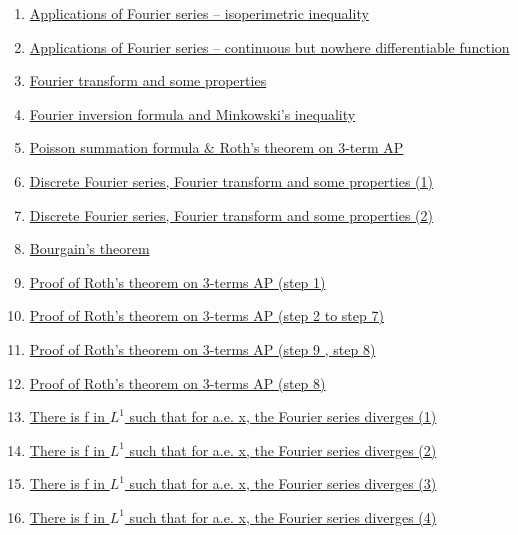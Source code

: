 \documentclass[11pt]{article}
\begin{document}
\begin{enumerate}
	\item	\href{https://mp.weixin.qq.com/s/iIWy0J2VjjtLPdH1Xtpw2A}{Applications of Fourier series – isoperimetric inequality} 	%
	\item 	\href{https://mp.weixin.qq.com/s/zFWDaC4RMTNcZMaEoUb7Iw}{Applications of Fourier series – continuous but nowhere differentiable function}	%
	\item 	\href{https://mp.weixin.qq.com/s/vafsXLbIouwEudCbt6gzhA}{Fourier transform and some properties}	%
	\item 	\href{https://mp.weixin.qq.com/s/hBs4ElZa2V95lLbnyi3qNg}{Fourier inversion formula and Minkowski's inequality}	%
	\item 	\href{https://mp.weixin.qq.com/s/JZXYVWcqn5tfjxecIPsyEA}{Poisson summation formula \& Roth's theorem on 3-term AP}	%
	\item 	\href{https://mp.weixin.qq.com/s/HKBxFlChuJpQPru7-EUPMA}{Discrete Fourier series, Fourier transform and some properties (1)}	%
	\item 	\href{https://mp.weixin.qq.com/s/dbqjLczJmPPk2UCY1gu5uA}{Discrete Fourier series, Fourier transform and some properties (2)}	%
	\item 	\href{https://mp.weixin.qq.com/s/-CJqt4TfShm67tdGhtJIQA}{Bourgain's theorem}	%
	\item	\href{https://mp.weixin.qq.com/s/m7KBS-pxKYPkdu2C5qcaYA}{Proof of Roth's theorem on 3-terms AP (step 1)}	%
	\item	\href{https://mp.weixin.qq.com/s/YQKnyXQFBdJaGGZW8PIYyA}{Proof of Roth's theorem on 3-terms AP (step 2 to step 7)}	%
	\item	\href{https://mp.weixin.qq.com/s/uNtqocYMHuEJGnJACyzCCA}{Proof of Roth's theorem on 3-terms AP (step 9 , step 8)} 	%
	\item 	\href{https://mp.weixin.qq.com/s/F09dwuDWQZo2icfUVU5n8g}{Proof of Roth's theorem on 3-terms AP (step 8)}	%
	\item 	\href{https://mp.weixin.qq.com/s/ZxVYVBl_wdy62OSQnh5djg}{There is f in $L^1$ such that for a.e. x, the Fourier series diverges (1)}	%
	\item 	\href{https://mp.weixin.qq.com/s/5yJ6R74prvfVDOLL7xMUUw}{There is f in $L^1$ such that for a.e. x, the Fourier series diverges (2)}	%
	\item 	\href{https://mp.weixin.qq.com/s/dvcfJ95Gof7rCDUlMr_YDw}{There is f in $L^1$ such that for a.e. x, the Fourier series diverges (3)}	%
	\item 	\href{https://mp.weixin.qq.com/s/6lLfQ3tq_BGrOEXlW60uUA}{There is f in $L^1$ such that for a.e. x, the Fourier series diverges (4)}	%
\end{enumerate}
\end{document}
